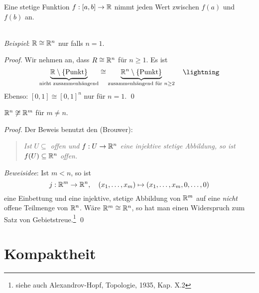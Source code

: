 \begin{corollary}[Zwischenwertsatz]
  Eine stetige Funktion \( f: [a,b] \to \mathbb{R} \) nimmt jeden Wert zwischen \( f(a) \) und \( f(b) \) an.
\end{corollary}

\begin{remark}
  \  \\ \emph{Beispiel}: \( \mathbb{R} \cong \mathbb{R}^n \) nur falls \( n = 1 \).
  \begin{proof}
    Wir nehmen an, dass \( R \cong \mathbb{R}^n \) für \( n \geq 1 \). Es ist
    \begin{equation*}
      \underbrace{\R \setminus \{ \text{Punkt} \}}_{\text{nicht zusammenhängend}} \cong \underbrace{\R^n \setminus \{ \text{Punkt} \} }_{\text{zusammenhängend für } n \geq 2} \quad \lightning
    \end{equation*}
    Ebenso: \( [0,1] \cong {[0,1]}^n \) nur für \( n = 1 \). \qed{}
  \end{proof}
\end{remark}

\begin{theorem}
  \( \mathbb{R}^n \not \cong \mathbb{R}^m \) für \( m \neq n \).
  \begin{proof}
    Der Beweis benutzt den \label{th:satzGebietstreue} (Brouwer):
    \begin{quote}
      \emph{Ist \( U \subseteq \) offen und \( f: U \to \mathbb{R}^n \) eine injektive stetige Abbildung, so ist \( f(U) \subseteq \mathbb{R}^n \) offen.}
    \end{quote}
    \emph{Beweisidee}: Ist \( m < n \), so ist
    \begin{equation*}
      j: \mathbb{R}^m \to \mathbb{R}^n, \quad (x_1, \dots, x_m) \mapsto (x_1, \dots, x_m, 0, \dots, 0)
    \end{equation*}
    eine Einbettung und eine injektive, stetige Abbildung von \( \mathbb{R}^m \) auf eine \emph{nicht} offene Teilmenge von \( \mathbb{R}^n \). Wäre \( \mathbb{R}^m \cong \mathbb{R}^n \), so hat man einen Widerspruch zum Satz von Gebietstreue.\footnote{siehe auch Alexandrov-Hopf, Topologie, 1935, Kap. X.2} \qed{}
  \end{proof}
\end{theorem}

\section{Kompaktheit}

